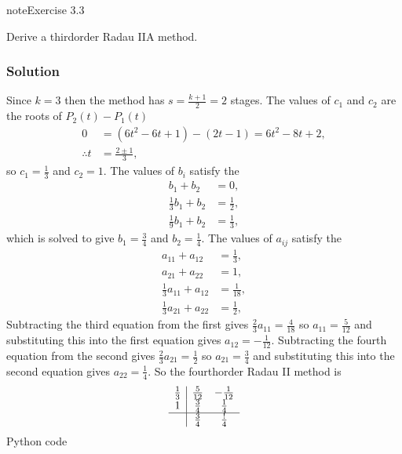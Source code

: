 \documentclass[letterpaper,10pt,english]{jupyterBook}
\begin{document}
\begin{sphinxadmonition}{note}{Exercise 3.3}

\sphinxAtStartPar
Derive a third\sphinxhyphen{}order Radau IIA method.
\subsubsection*{Solution}

\sphinxAtStartPar
Since \(k=3\) then the method has \(s = \frac{k + 1}{2} = 2\) stages. The values of \(c_1\) and \(c_2\) are the roots of \(P_2(t) - P_1(t)\)
\begin{align*}
    0 &= (6t^2 - 6t + 1) - (2t - 1) = 6t^2 - 8t + 2, \\
    \therefore t &= \frac{2 \pm 1}{3},
\end{align*}
\sphinxAtStartPar
so \(c_1 = \frac{1}{3}\) and \(c_2 = 1\). The values of \(b_i\) satisfy the {\hyperref[\detokenize{3_IRKs/3.0_IRKs:bk-ck-dk-order-conditions}]{}}
\begin{align*}
    b_1 + b_2 &= 0, \\
    \tfrac{1}{3} b_1 + b_2 &= \tfrac{1}{2}, \\
    \tfrac{1}{9} b_1 + b_2 &= \tfrac{1}{3},
\end{align*}
\sphinxAtStartPar
which is solved to give \(b_1 = \frac{3}{4}\) and \(b_2 = \frac{1}{4}\). The values of \(a_{ij}\) satisfy the {\hyperref[\detokenize{3_IRKs/3.0_IRKs:bk-ck-dk-order-conditions}]{}}
\begin{align*}
    a_{11} + a_{12} &= \tfrac{1}{3}, \\
    a_{21} + a_{22} &= 1, \\
    \tfrac{1}{3} a_{11} + a_{12} &= \tfrac{1}{18}, \\
    \tfrac{1}{3} a_{21} + a_{22} &= \tfrac{1}{2},
\end{align*}
\sphinxAtStartPar
Subtracting the third equation from the first gives \(\frac{2}{3} a_{11} = \frac{4}{18}\) so \(a_{11} = \frac{5}{12}\) and substituting this into the first equation gives \(a_{12} = -\frac{1}{12}\). Subtracting the fourth equation from the second gives \(\frac{2}{3} a_{21} = \frac{1}{2}\) so \(a_{21} = \frac{3}{4}\) and substituting this into the second equation gives \(a_{22} = \frac{1}{4}\). So the fourth\sphinxhyphen{}order Radau II method is
\begin{align*}
    \begin{array}{c|cc}
        \frac{1}{3} & \frac{5}{12} & -\frac{1}{12} \\
        1 & \frac{3}{4} & \frac{1}{4} \\
        \hline
        & \frac{3}{4} & \frac{!}{4}
    \end{array}
\end{align*}
\sphinxAtStartPar
Python code


\end{sphinxadmonition}
\end{document}
